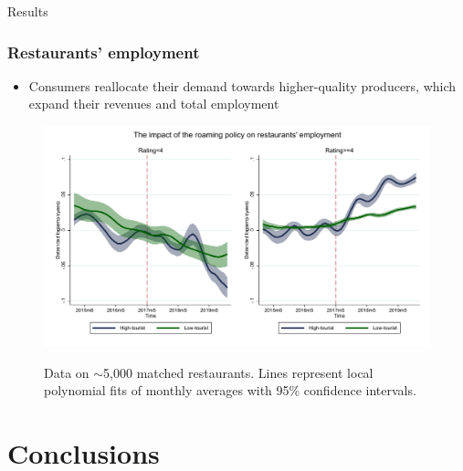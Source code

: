 \documentclass[aspectratio=169]{beamer}
\begin{document}
\begin{frame}[noframenumbering]
\Huge{\centerline{Results}}
\end{frame}

\begin{frame}[label=employees_fig]
\frametitle{Restaurants' employment}

\begin{itemize}
\item<1-> Consumers reallocate their demand towards higher-quality producers, which  expand their revenues and total employment \hyperlink{employees_eq}{}
\end{itemize}

\begin{figure}[H]\centering
\label{fig:f3}
\includegraphics[scale=0.62]{Figures/new_g4.pdf} 
\begin{minipage}{0.8\textwidth} %
{\tiny Data on $\sim$5,000 matched restaurants.  Lines represent local polynomial fits of monthly averages with 95\% confidence intervals.\par}
\end{minipage}
\end{figure} 

\end{frame}


\section{Conclusions}
\end{document}
